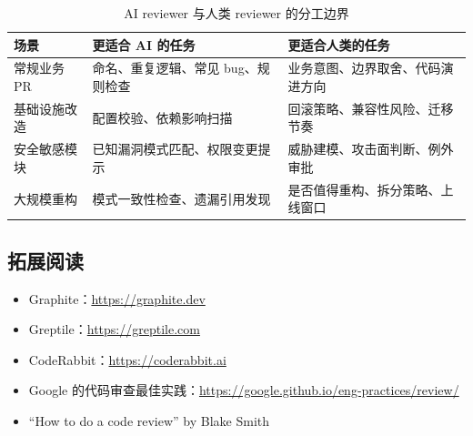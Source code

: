 \begin{table}[H]
\centering
\begin{tabular}{p{} p{} p{}}
\toprule
场景 & 更适合 AI 的任务 & 更适合人类的任务 \\
\midrule
常规业务 PR & 命名、重复逻辑、常见 bug、规则检查 & 业务意图、边界取舍、代码演进方向 \\
基础设施改造 & 配置校验、依赖影响扫描 & 回滚策略、兼容性风险、迁移节奏 \\
安全敏感模块 & 已知漏洞模式匹配、权限变更提示 & 威胁建模、攻击面判断、例外审批 \\
大规模重构 & 模式一致性检查、遗漏引用发现 & 是否值得重构、拆分策略、上线窗口 \\
\bottomrule
\end{tabular}
\caption{AI reviewer 与人类 reviewer 的分工边界}
\end{table}

\subsection{拓展阅读}

\begin{itemize}
    \item Graphite：\url{https://graphite.dev}
    \item Greptile：\url{https://greptile.com}
    \item CodeRabbit：\url{https://coderabbit.ai}
    \item Google 的代码审查最佳实践：\url{https://google.github.io/eng-practices/review/}
    \item ``How to do a code review'' by Blake Smith
\end{itemize}



